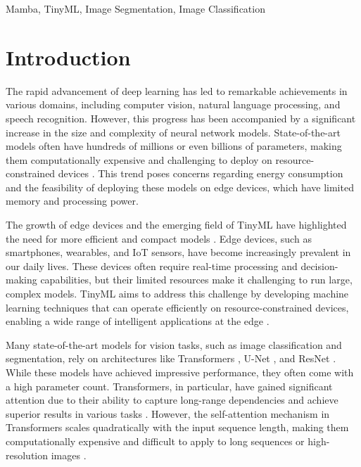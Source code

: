 \documentclass[conference]{IEEEtran}
\begin{document}
\begin{IEEEkeywords}
    Mamba, TinyML, Image Segmentation, Image Classification
\end{IEEEkeywords}

\section{Introduction}
The rapid advancement of deep learning has led to remarkable achievements in various domains, including computer vision, natural language processing, and speech recognition. However, this progress has been accompanied by a significant increase in the size and complexity of neural network models. State-of-the-art models often have hundreds of millions or even billions of parameters, making them computationally expensive and challenging to deploy on resource-constrained devices \cite{brown2020language, dosovitskiy2021image}. This trend poses concerns regarding energy consumption and the feasibility of deploying these models on edge devices, which have limited memory and processing power.

The growth of edge devices and the emerging field of TinyML have highlighted the need for more efficient and compact models \cite{warden2019tinyml}. Edge devices, such as smartphones, wearables, and IoT sensors, have become increasingly prevalent in our daily lives. These devices often require real-time processing and decision-making capabilities, but their limited resources make it challenging to run large, complex models. TinyML aims to address this challenge by developing machine learning techniques that can operate efficiently on resource-constrained devices, enabling a wide range of intelligent applications at the edge \cite{banbury2021benchmarking}.

Many state-of-the-art models for vision tasks, such as image classification and segmentation, rely on architectures like Transformers \cite{dosovitskiy2021image}, U-Net \cite{ronneberger2015unet}, and ResNet \cite{he2016deep}. While these models have achieved impressive performance, they often come with a high parameter count. Transformers, in particular, have gained significant attention due to their ability to capture long-range dependencies and achieve superior results in various tasks \cite{vaswani2017attention}. However, the self-attention mechanism in Transformers scales quadratically with the input sequence length, making them computationally expensive and difficult to apply to long sequences or high-resolution images \cite{choromanski2020rethinking}.
\end{document}
